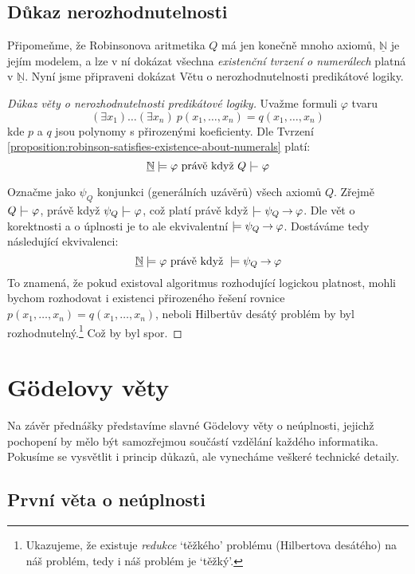 \subsection{Důkaz nerozhodnutelnosti}

Připomeňme, že Robinsonova aritmetika $Q$ má jen konečně mnoho axiomů, $\underline{\mathbb N}$ je jejím modelem, a lze v ní dokázat všechna \emph{existenční tvrzení o numerálech} platná v $\underline{\mathbb N}$. Nyní jsme připraveni dokázat Větu o nerozhodnutelnosti predikátové logiky.

\begin{proof}[Důkaz věty o nerozhodnutelnosti predikátové logiky]
Uvažme formuli $\varphi$ tvaru 
$$(\exists x_1)\dots(\exists x_n)\ p(x_1,\dots,x_n)=q(x_1,\dots,x_n)
$$ 
kde $p$ a $q$ jsou polynomy s přirozenými koeficienty. Dle Tvrzení \ref{proposition:robinson-satisfies-existence-about-numerals} platí:
$$
\underline{\mathbb N}\models \varphi\text{ právě když }Q\proves \varphi
$$

Označme jako $\psi_Q$ konjunkci (generálních uzávěrů) všech axiomů $Q$. Zřejmě $Q\proves\varphi$, právě když $\psi_Q\proves\varphi$, což platí právě když $\proves\psi_Q\limplies\varphi$. Dle vět o korektnosti a o úplnosti je to ale ekvivalentní $\models\psi_Q\mathbin{\rightarrow}\varphi$. Dostáváme tedy následující ekvivalenci:
$$
\underline{\mathbb N}\models \varphi\text{ právě když }\models \psi_Q\mathbin{\rightarrow}\varphi
$$
To znamená, že pokud existoval algoritmus rozhodující logickou platnost, mohli bychom rozhodovat i existenci přirozeného řešení rovnice $p(x_1,\dots,x_n)=q(x_1,\dots,x_n)$, neboli Hilbertův desátý problém by byl rozhodnutelný.\footnote{Ukazujeme, že existuje \emph{redukce} `těžkého' problému (Hilbertova desátého) na náš problém, tedy i náš problém je `těžký'.} Což by byl spor.   
\end{proof}

\section{Gödelovy věty}

Na závěr přednášky představíme slavné Gödelovy věty o neúplnosti, jejichž pochopení by mělo být samozřejmou součástí vzdělání každého informatika. Pokusíme se vysvětlit i princip důkazů, ale vynecháme veškeré technické detaily.

\subsection{První věta o neúplnosti}

